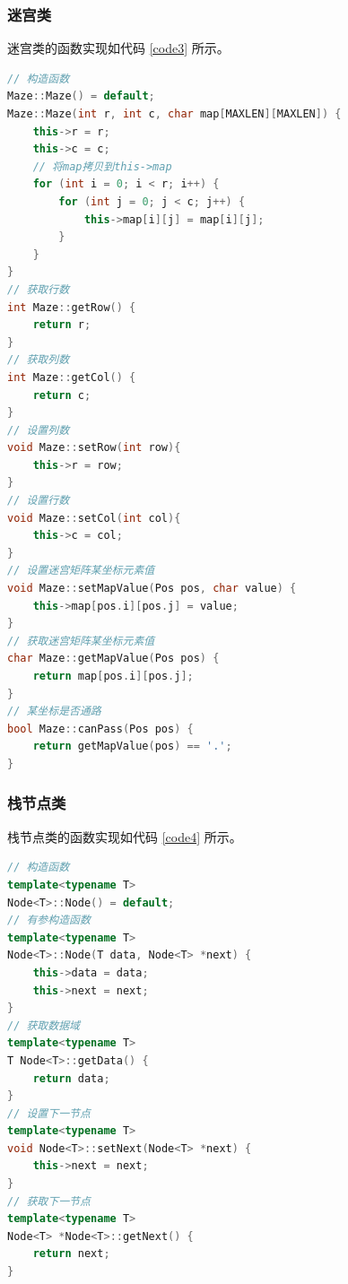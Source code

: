 \documentclass{ctexart}
\begin{document}
    \subsubsection{迷宫类}
    迷宫类的函数实现如代码 \ref{code3} 所示。
\begin{lstlisting}[language=C++,caption=Maze类的实现,label=code3]
// 构造函数
Maze::Maze() = default;
Maze::Maze(int r, int c, char map[MAXLEN][MAXLEN]) {
    this->r = r;
    this->c = c;
    // 将map拷贝到this->map
    for (int i = 0; i < r; i++) {
        for (int j = 0; j < c; j++) {
            this->map[i][j] = map[i][j];
        }
    }
}
// 获取行数
int Maze::getRow() {
    return r;
}
// 获取列数
int Maze::getCol() {
    return c;
}
// 设置列数
void Maze::setRow(int row){
    this->r = row;
}
// 设置行数
void Maze::setCol(int col){
    this->c = col;
}
// 设置迷宫矩阵某坐标元素值
void Maze::setMapValue(Pos pos, char value) {
    this->map[pos.i][pos.j] = value;
}
// 获取迷宫矩阵某坐标元素值
char Maze::getMapValue(Pos pos) {
    return map[pos.i][pos.j];
}
// 某坐标是否通路
bool Maze::canPass(Pos pos) {
    return getMapValue(pos) == '.';
}
\end{lstlisting}

    \subsubsection{栈节点类}
    栈节点类的函数实现如代码 \ref{code4} 所示。
\begin{lstlisting}[language=C++,caption=Node类的实现,label=code4]
// 构造函数
template<typename T>
Node<T>::Node() = default;
// 有参构造函数
template<typename T>
Node<T>::Node(T data, Node<T> *next) {
    this->data = data;
    this->next = next;
}
// 获取数据域
template<typename T>
T Node<T>::getData() {
    return data;
}
// 设置下一节点
template<typename T>
void Node<T>::setNext(Node<T> *next) {
    this->next = next;
}
// 获取下一节点
template<typename T>
Node<T> *Node<T>::getNext() {
    return next;
}
\end{lstlisting}
\end{document}
